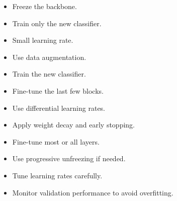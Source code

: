\begin{propertybox}
\begin{itemize}
    \item Freeze the backbone.
    \item Train only the new classifier.
    \item Small learning rate.
    \item Use data augmentation.
\end{itemize}
\end{propertybox}

\begin{propertybox}
\begin{itemize}
    \item Train the new classifier.
    \item Fine-tune the last few blocks.
    \item Use differential learning rates.
    \item Apply weight decay and early stopping.
\end{itemize}
\end{propertybox}

\begin{propertybox}
\begin{itemize}
    \item Fine-tune most or all layers.
    \item Use progressive unfreezing if needed.
    \item Tune learning rates carefully.
    \item Monitor validation performance to avoid overfitting.
\end{itemize}
\end{propertybox}
